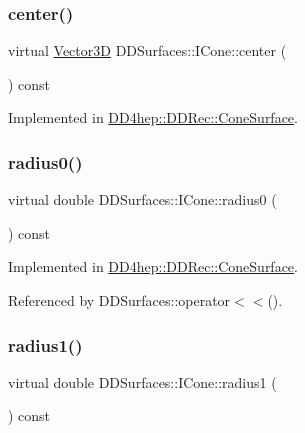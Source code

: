 \subsubsection{\texorpdfstring{center()}{center()}}
{\footnotesize\ttfamily virtual \hyperlink{class_d_d_surfaces_1_1_vector3_d}{Vector3D} D\+D\+Surfaces\+::\+I\+Cone\+::center (\begin{DoxyParamCaption}{ }\end{DoxyParamCaption}) const\hspace{0.3cm}{\ttfamily [pure virtual]}}



Implemented in \hyperlink{class_d_d4hep_1_1_d_d_rec_1_1_cone_surface_ad3fe5b411845bd6985c049e703351843}{D\+D4hep\+::\+D\+D\+Rec\+::\+Cone\+Surface}.

\hypertarget{class_d_d_surfaces_1_1_i_cone_af7be60438f58e45d5e82a2d826a0a7d7}{}\label{class_d_d_surfaces_1_1_i_cone_af7be60438f58e45d5e82a2d826a0a7d7} 
\subsubsection{\texorpdfstring{radius0()}{radius0()}}
{\footnotesize\ttfamily virtual double D\+D\+Surfaces\+::\+I\+Cone\+::radius0 (\begin{DoxyParamCaption}{ }\end{DoxyParamCaption}) const\hspace{0.3cm}{\ttfamily [pure virtual]}}



Implemented in \hyperlink{class_d_d4hep_1_1_d_d_rec_1_1_cone_surface_a9115c03c32a393430c0c92bb98c7a715}{D\+D4hep\+::\+D\+D\+Rec\+::\+Cone\+Surface}.



Referenced by D\+D\+Surfaces\+::operator$<$$<$().

\hypertarget{class_d_d_surfaces_1_1_i_cone_a58fb9fc961cc2580a6cc1d5fda4d817e}{}\label{class_d_d_surfaces_1_1_i_cone_a58fb9fc961cc2580a6cc1d5fda4d817e} 
\subsubsection{\texorpdfstring{radius1()}{radius1()}}
{\footnotesize\ttfamily virtual double D\+D\+Surfaces\+::\+I\+Cone\+::radius1 (\begin{DoxyParamCaption}{ }\end{DoxyParamCaption}) const\hspace{0.3cm}{\ttfamily [pure virtual]}}



